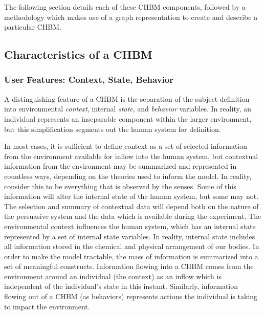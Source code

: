 \documentclass[runningheads,a4paper]{llncs}
\begin{document}
The following section details each of these CHBM components, followed by a methodology which makes use of a graph representation to create and describe a particular CHBM.

\subsection{Characteristics of a CHBM}
\subsubsection{User Features: Context, State, Behavior}
A distinguishing feature of a CHBM is the separation of the subject definition into environmental \emph{context}, internal \emph{state}, and \emph{behavior} variables.
In reality, an individual represents an inseparable component within the larger environment, but this simplification segments out the human system for definition.

In most cases, it is sufficient to define context as a set of selected information from the environment available for inflow into the human system, but contextual information from the environment may be summarized and represented in countless ways, depending on the theories used to inform the model.
In reality, consider this to be everything that is observed by the senses. 
Some of this information will alter the internal state of the human system, but some may not. 
The selection and summary of contextual data will depend both on the nature of the persuasive system and the data which is available during the experiment.
The environmental context influences the human system, which has an internal state represented by a set of internal state variables.
In reality, internal state includes all information stored in the chemical and physical  arrangement of our bodies. 
In order to make the model tractable, the mass of information is summarized into a set of meaningful constructs.
Information flowing into a CHBM comes from the environment around an individual (the context) as an inflow which is independent of the individual's state in this instant.
Similarly, information flowing out of a CHBM (as behaviors) represents actions the individual is taking to impact the environment.
\end{document}
